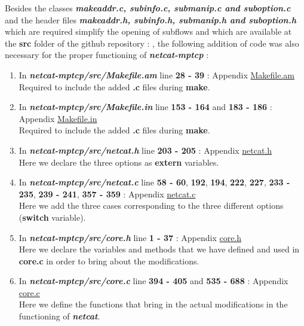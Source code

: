 \documentclass[a4paper,11pt]{article}
\begin{document}
			Besides the classes \textbf{\emph{makeaddr.c, subinfo.c, submanip.c and suboption.c}} and the header files \textbf{\emph{makeaddr.h, subinfo.h, submanip.h and suboption.h}} which are required simplify the opening of subflows and which are available at the \textbf{src} folder of the github repository : \cite[https://github.com/lawrenceFR/netcat-mptcp]{github}, the following addition of code was also necessary for the proper functioning of \textbf{\emph{netcat-mptcp}} :
			\begin{enumerate}
				\item In \textbf{\emph{netcat-mptcp/src/Makefile.am}} line \textbf{28 - 39} : Appendix \hyperref[subsec:Makefile.am]{Makefile.am} \\
				Required to include the added \textbf{.c} files during \textbf{make}.

				\item In \textbf{\emph{netcat-mptcp/src/Makefile.in}} line \textbf{153 - 164} and \textbf{183 - 186} : Appendix \hyperref[subsec:Makefile.in]{Makefile.in} \\
				Required to include the added \textbf{.c} files during \textbf{make}.

				\item In \textbf{\emph{netcat-mptcp/src/netcat.h}} line \textbf{203 - 205} : Appendix \hyperref[subsec:netcat.h]{netcat.h} \\
				Here we declare the three options as \textbf{extern} variables.

				\item In \textbf{\emph{netcat-mptcp/src/netcat.c}} line \textbf{58 - 60}, \textbf{192}, \textbf{194}, \textbf{222}, \textbf{227}, \textbf{233 - 235}, \textbf{239 - 241}, \textbf{357 - 359} : Appendix \hyperref[subsec:netcat.c]{netcat.c} \\
				Here we add the three cases corresponding to the three different options (\textbf{switch} variable).

				\item In \textbf{\emph{netcat-mptcp/src/core.h}} line \textbf{1 - 37} : Appendix \hyperref[subsec:core.h]{core.h} \\
				Here we declare the variables and methods that we have defined and used in \textbf{core.c} in order to bring about the modifications.

				\item In \textbf{\emph{netcat-mptcp/src/core.c}} line \textbf{394 - 405} and \textbf{535 - 688} : Appendix \hyperref[subsec:core.c]{core.c} \\
				Here we define the functions that bring in the actual modifications in the functioning of \textbf{\emph{netcat}}.
			\end{enumerate}
\end{document}
